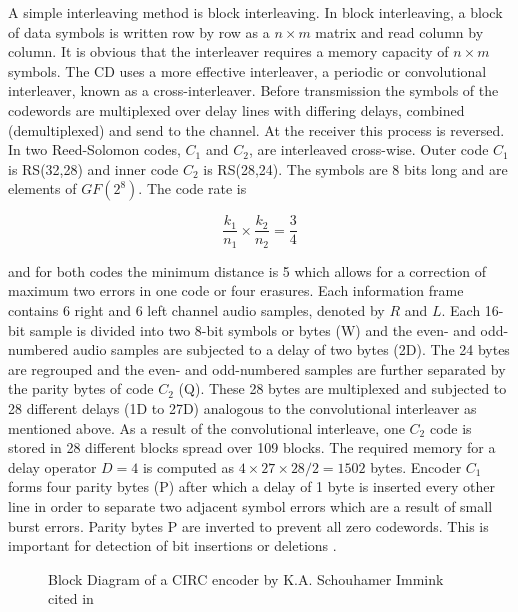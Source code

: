 \documentclass[../main.tex]{subfiles}
\begin{document}
    A simple interleaving method is block interleaving. In block interleaving, a block of data symbols is written row by row as a $n \times m$ matrix and read column by column. It is obvious that the interleaver requires a memory capacity of $n \times m$ symbols. The CD uses a more effective interleaver, a periodic or convolutional interleaver, known as a cross-interleaver. Before transmission the symbols of the codewords are multiplexed over delay lines with differing delays, combined (demultiplexed) and send to the channel. At the receiver this process is reversed. In  two Reed-Solomon codes, $C_1$ and $C_2$, are interleaved cross-wise. Outer code $C_1$ is RS(32,28) and inner code $C_2$ is RS(28,24). The symbols are 8 bits long and are elements of $GF(2^8)$. The code rate is

    \begin{equation*}
        \frac{k_1}{n_1} \times \frac{k_2}{n_2} = \frac{3}{4}
    \end{equation*}

    \noindent
    and for both codes the minimum distance is 5 which allows for a correction of maximum two errors in one code or four erasures. Each information frame contains 6 right and 6 left channel audio samples, denoted by $R$ and $L$. Each 16-bit sample is divided into two 8-bit symbols or bytes (W) and the even- and odd-numbered audio samples are subjected to a delay of two bytes (2D). The 24 bytes are regrouped and the even- and odd-numbered samples are further separated by the parity bytes of code $C_2$ (Q). These 28 bytes are multiplexed and subjected to 28 different delays (1D to 27D) analogous to the convolutional interleaver as mentioned above. As a result of the convolutional interleave, one $C_2$ code is stored in 28 different blocks spread over 109 blocks. The required memory for a delay operator $D=4$ is computed as $4 \times 27 \times 28/2 = 1502$ bytes. Encoder $C_1$ forms four parity bytes (P) after which a delay of 1 byte is inserted every other line in order to separate two adjacent symbol errors which are a result of small burst errors. Parity bytes P are inverted to prevent all zero codewords. This is important for detection of bit insertions or deletions \autocite{wicker1999reed}.

    \newpage
    \begin{figure}[h!tp]
        \centering
        [Placeholder]
        \caption{Block Diagram of a CIRC encoder by K.A. Schouhamer Immink cited in \autocite{wicker1999reed}}
        \label{fig:circ_encoder}
    \end{figure}
    \newpage
\end{document}
